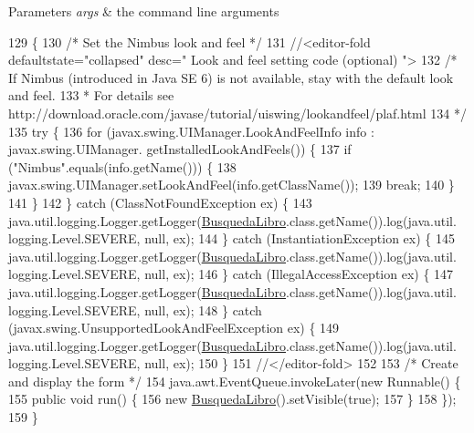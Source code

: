 \begin{DoxyParams}{Parameters}
{\em args} & the command line arguments \\
\hline
\end{DoxyParams}

\begin{DoxyCode}
129                                            \{
130         \textcolor{comment}{/* Set the Nimbus look and feel */}
131         \textcolor{comment}{//<editor-fold defaultstate="collapsed" desc=" Look and feel setting code (optional) ">}
132         \textcolor{comment}{/* If Nimbus (introduced in Java SE 6) is not available, stay with the default look and feel.}
133 \textcolor{comment}{         * For details see http://download.oracle.com/javase/tutorial/uiswing/lookandfeel/plaf.html }
134 \textcolor{comment}{         */}
135         \textcolor{keywordflow}{try} \{
136             \textcolor{keywordflow}{for} (javax.swing.UIManager.LookAndFeelInfo info : javax.swing.UIManager.
      getInstalledLookAndFeels()) \{
137                 \textcolor{keywordflow}{if} (\textcolor{stringliteral}{"Nimbus"}.equals(info.getName())) \{
138                     javax.swing.UIManager.setLookAndFeel(info.getClassName());
139                     \textcolor{keywordflow}{break};
140                 \}
141             \}
142         \} \textcolor{keywordflow}{catch} (ClassNotFoundException ex) \{
143             java.util.logging.Logger.getLogger(\mbox{\hyperlink{class_interfaz_package_1_1_busqueda_libro_a81c88fc8c319bd5a2f2869fa751f8571}{BusquedaLibro}}.class.getName()).log(java.util.
      logging.Level.SEVERE, null, ex);
144         \} \textcolor{keywordflow}{catch} (InstantiationException ex) \{
145             java.util.logging.Logger.getLogger(\mbox{\hyperlink{class_interfaz_package_1_1_busqueda_libro_a81c88fc8c319bd5a2f2869fa751f8571}{BusquedaLibro}}.class.getName()).log(java.util.
      logging.Level.SEVERE, null, ex);
146         \} \textcolor{keywordflow}{catch} (IllegalAccessException ex) \{
147             java.util.logging.Logger.getLogger(\mbox{\hyperlink{class_interfaz_package_1_1_busqueda_libro_a81c88fc8c319bd5a2f2869fa751f8571}{BusquedaLibro}}.class.getName()).log(java.util.
      logging.Level.SEVERE, null, ex);
148         \} \textcolor{keywordflow}{catch} (javax.swing.UnsupportedLookAndFeelException ex) \{
149             java.util.logging.Logger.getLogger(\mbox{\hyperlink{class_interfaz_package_1_1_busqueda_libro_a81c88fc8c319bd5a2f2869fa751f8571}{BusquedaLibro}}.class.getName()).log(java.util.
      logging.Level.SEVERE, null, ex);
150         \}
151         \textcolor{comment}{//</editor-fold>}
152 
153         \textcolor{comment}{/* Create and display the form */}
154         java.awt.EventQueue.invokeLater(\textcolor{keyword}{new} Runnable() \{
155             \textcolor{keyword}{public} \textcolor{keywordtype}{void} run() \{
156                 \textcolor{keyword}{new} \mbox{\hyperlink{class_interfaz_package_1_1_busqueda_libro_a81c88fc8c319bd5a2f2869fa751f8571}{BusquedaLibro}}().setVisible(\textcolor{keyword}{true});
157             \}
158         \});
159     \}
\end{DoxyCode}


